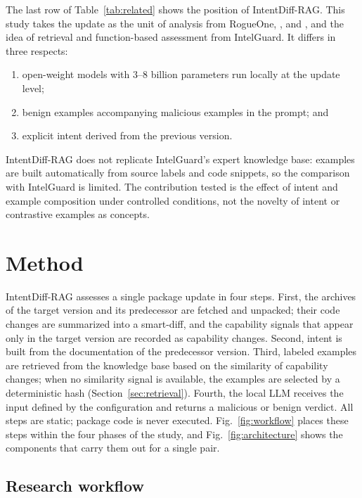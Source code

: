 \documentclass[a4paper,fleqn]{cas-dc}
\begin{document}
The last row of Table~\ref{tab:related} shows the position of IntentDiff-RAG. This study
takes the update as the unit of analysis from RogueOne,
\citet{froh2023differential}, and \citet{wyss2025evaluating}, and the idea of
retrieval and function-based assessment from IntelGuard. It differs in
three respects:
\begin{enumerate}
\item open-weight models with 3--8 billion parameters run locally at the
update level;
\item benign examples accompanying malicious examples in the prompt; and
\item explicit intent derived from the previous version.
\end{enumerate}
IntentDiff-RAG does not replicate IntelGuard's expert knowledge base: examples are
built automatically from source labels and code snippets, so the comparison with
IntelGuard is limited. The contribution tested is the effect of intent and example
composition under controlled conditions, not the novelty of intent or contrastive
examples as concepts.

\section{Method}\label{sec:method}
IntentDiff-RAG assesses a single package update in four steps. First, the
archives of the target version and its predecessor are fetched and unpacked;
their code changes are summarized into a smart-diff, and the capability signals
that appear only in the target version are recorded as capability changes.
Second, intent is built from the documentation of the predecessor version.
Third, labeled examples are retrieved from the knowledge base based on the
similarity of capability changes; when no similarity signal is available, the
examples are selected by a deterministic hash (Section~\ref{sec:retrieval}).
Fourth, the local LLM receives the input defined by the configuration and
returns a malicious or benign verdict. All steps are static; package code is
never executed. Fig.~\ref{fig:workflow} places these steps within the four
phases of the study, and Fig.~\ref{fig:architecture} shows the components that
carry them out for a single pair.

\subsection{Research workflow}\label{sec:workflow}
\end{document}
